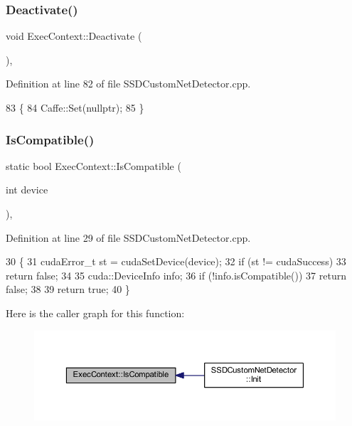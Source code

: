 \subsubsection{\texorpdfstring{Deactivate()}{Deactivate()}}
{\footnotesize\ttfamily void Exec\+Context\+::\+Deactivate (\begin{DoxyParamCaption}{ }\end{DoxyParamCaption})\hspace{0.3cm}{\ttfamily [inline]}, {\ttfamily [private]}}



Definition at line 82 of file S\+S\+D\+Custom\+Net\+Detector.\+cpp.


\begin{DoxyCode}
83     \{
84         Caffe::Set(\textcolor{keyword}{nullptr});
85     \}
\end{DoxyCode}
\mbox{\label{class_exec_context_ae0873cef48079986d31639654f915bd0}} 
\subsubsection{\texorpdfstring{Is\+Compatible()}{IsCompatible()}}
{\footnotesize\ttfamily static bool Exec\+Context\+::\+Is\+Compatible (\begin{DoxyParamCaption}\item[{int}]{device }\end{DoxyParamCaption})\hspace{0.3cm}{\ttfamily [inline]}, {\ttfamily [static]}}



Definition at line 29 of file S\+S\+D\+Custom\+Net\+Detector.\+cpp.


\begin{DoxyCode}
30     \{
31         cudaError\_t st = cudaSetDevice(device);
32         \textcolor{keywordflow}{if} (st != cudaSuccess)
33             \textcolor{keywordflow}{return} \textcolor{keyword}{false};
34 
35         cuda::DeviceInfo info;
36         \textcolor{keywordflow}{if} (!info.isCompatible())
37             \textcolor{keywordflow}{return} \textcolor{keyword}{false};
38 
39         \textcolor{keywordflow}{return} \textcolor{keyword}{true};
40     \}
\end{DoxyCode}
Here is the caller graph for this function\+:\nopagebreak
\begin{figure}[H]
\begin{center}
\leavevmode
\includegraphics[width=350pt]{class_exec_context_ae0873cef48079986d31639654f915bd0_icgraph}
\end{center}
\end{figure}


